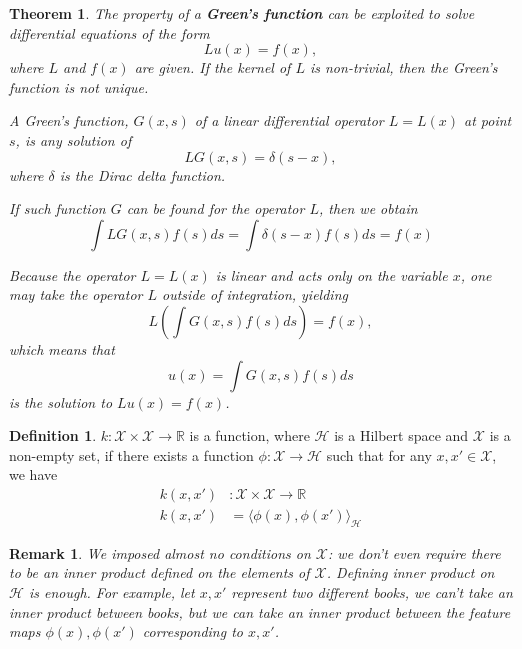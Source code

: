 \documentclass[a4paper]{article}
\theoremstyle{definition}
\newtheorem{definition}{Definition}
\theoremstyle{plain}
\newtheorem{theorem}{Theorem}
\newtheorem{remark}{Remark}
\newcounter{example}{Example}
\begin{document}
\begin{theorem}
The property of a \textbf{Green's function} can be exploited to solve differential equations of the form
\begin{equation*}
    Lu(x)=f(x),
\end{equation*}
where $L$ and $f(x)$ are given. If the kernel of $L$ is non-trivial, then the Green's function is not unique.

A Green's function, $G(x,s)$ of a linear differential operator $L=L(x)$ at point $s$, is any solution of
\begin{equation*}
    LG(x,s)=\delta(s-x),
\end{equation*}
where $\delta$ is the Dirac delta function.

If such function $G$ can be found for the operator $L$, then we obtain
\begin{equation*}
    \int LG(x,s)f(s)ds=\int\delta(s-x)f(s)ds=f(x)
\end{equation*}

Because the operator $L=L(x)$ is linear and acts only on the variable $x$, one may take the operator $L$ outside of integration, yielding
\begin{equation*}
    L\left(\int G(x,s)f(s)ds\right)=f(x),
\end{equation*}
which means that 
\begin{equation*}
    u(x)=\int G(x,s)f(s)ds
\end{equation*}
is the solution to $Lu(x)=f(x)$.
\end{theorem}

\begin{definition}\cite{ucl}
 $k:\mathcal{X}\times\mathcal{X}\rightarrow\mathbb{R}$ is a function, where $\mathcal{H}$ is a Hilbert space and $\mathcal{X}$ is a non-empty set, if there exists a function $\phi:\mathcal{X}\rightarrow\mathcal{H}$ such that for any $x,x'\in\mathcal{X}$, we have
\begin{align*}
    k(x,x')&:\mathcal{X}\times\mathcal{X}\rightarrow\mathbb{R}\\
    k(x,x')&=\langle \phi(x),\phi(x')\rangle_\mathcal{H}
\end{align*} 
\end{definition}

\begin{remark}
We imposed almost no conditions on $\mathcal{X}$: we don't even require there to be an inner product defined on the elements of $\mathcal{X}$. Defining inner product on $\mathcal{H}$ is enough. For example, let $x,x'$ represent two different books, we can't take an inner product between books, but we can take an inner product between the feature maps $\phi(x),\phi(x')$ corresponding to $x,x'$.
\end{remark}
\end{document}
